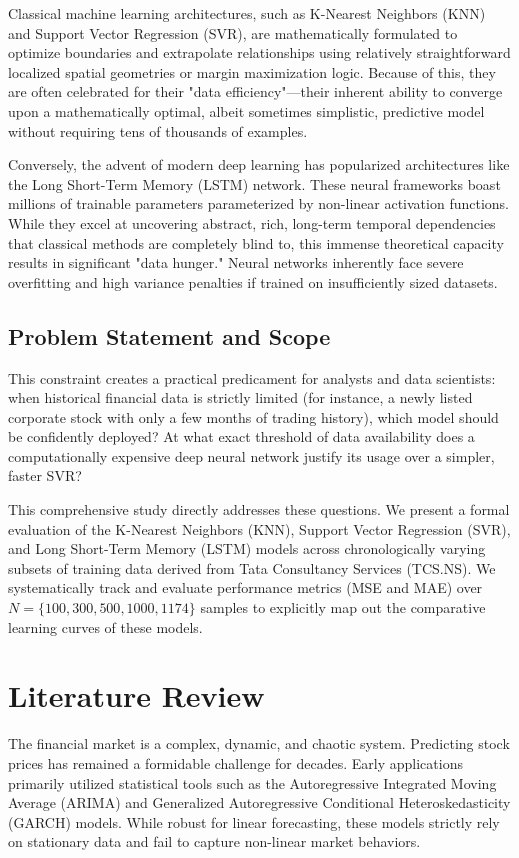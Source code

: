 \documentclass[12pt,onecolumn]{IEEEtran}
\begin{document}
Classical machine learning architectures, such as K-Nearest Neighbors (KNN) and Support Vector Regression (SVR), are mathematically formulated to optimize boundaries and extrapolate relationships using relatively straightforward localized spatial geometries or margin maximization logic. Because of this, they are often celebrated for their "data efficiency"---their inherent ability to converge upon a mathematically optimal, albeit sometimes simplistic, predictive model without requiring tens of thousands of examples. 

Conversely, the advent of modern deep learning has popularized architectures like the Long Short-Term Memory (LSTM) network. These neural frameworks boast millions of trainable parameters parameterized by non-linear activation functions. While they excel at uncovering abstract, rich, long-term temporal dependencies that classical methods are completely blind to, this immense theoretical capacity results in significant "data hunger." Neural networks inherently face severe overfitting and high variance penalties if trained on insufficiently sized datasets. 

\subsection{Problem Statement and Scope}
This constraint creates a practical predicament for analysts and data scientists: when historical financial data is strictly limited (for instance, a newly listed corporate stock with only a few months of trading history), which model should be confidently deployed? At what exact threshold of data availability does a computationally expensive deep neural network justify its usage over a simpler, faster SVR? 

This comprehensive study directly addresses these questions. We present a formal evaluation of the K-Nearest Neighbors (KNN), Support Vector Regression (SVR), and Long Short-Term Memory (LSTM) models across chronologically varying subsets of training data derived from Tata Consultancy Services (TCS.NS). We systematically track and evaluate performance metrics (MSE and MAE) over $N=\{100, 300, 500, 1000, 1174\}$ samples to explicitly map out the comparative learning curves of these models.

\section{Literature Review}
The financial market is a complex, dynamic, and chaotic system. Predicting stock prices has remained a formidable challenge for decades. Early applications primarily utilized statistical tools such as the Autoregressive Integrated Moving Average (ARIMA) and Generalized Autoregressive Conditional Heteroskedasticity (GARCH) models. While robust for linear forecasting, these models strictly rely on stationary data and fail to capture non-linear market behaviors.
\end{document}
